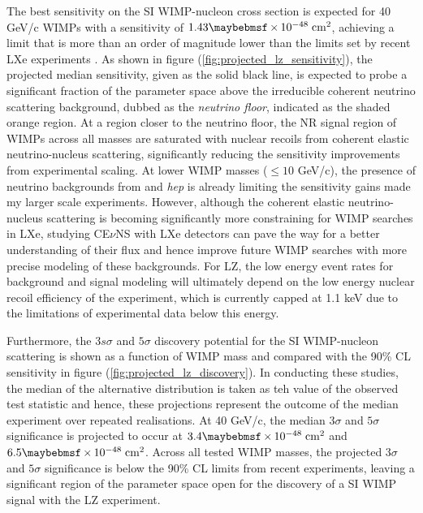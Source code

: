 {The best sensitivity on the SI WIMP-nucleon cross section is expected for 40 GeV/c\squared{} WIMPs with a sensitivity of $1.43 \times 10^{-48} \; \MathText{cm}^2$, achieving a limit that is more than an order of magnitude lower than the limits set by recent LXe experiments \cite{lux_full, xenon_1t, pandax_limit}. As shown in figure (\ref{fig:projected_lz_sensitivity}), the projected median sensitivity, given as the solid black line, is expected to probe a significant fraction of the parameter space above the irreducible coherent neutrino scattering background, dubbed as the \textit{neutrino floor}, indicated as the shaded orange region. At a region closer to the neutrino floor, the NR signal region of WIMPs across all masses are saturated with nuclear recoils from coherent elastic neutrino-nucleus scattering, significantly reducing the sensitivity improvements from experimental scaling. At lower WIMP masses ($\leqslant10$ GeV/c\squared{}), the presence of neutrino backgrounds from \BE{} and \textit{hep} is already limiting the sensitivity gains made my larger scale experiments. However, although the coherent elastic neutrino-nucleus scattering is becoming significantly more constraining for WIMP searches in LXe, studying CE$\nu$NS with LXe detectors can pave the way for a better understanding of their flux and hence improve future WIMP searches with more precise modeling of these backgrounds. For LZ, the low energy event rates for background and signal modeling will ultimately depend on the low energy nuclear recoil efficiency of the experiment, which is currently capped at 1.1 keV due to the limitations of experimental data below this energy.  

Furthermore, the $3s\sigma$ and $5\sigma$ discovery potential for the SI WIMP-nucleon scattering is shown as a function of WIMP mass and compared with the 90\% CL sensitivity in figure (\ref{fig:projected_lz_discovery}). In conducting these studies, the median of the alternative distribution is taken as teh value of the observed test statistic and hence, these projections represent the outcome of the median experiment over repeated realisations. At 40 GeV/c\squared{}, the median $3\sigma$ and $5\sigma$ significance is projected to occur at $3.4 \times 10^{-48} \; \MathText{cm}^2$ and $6.5 \times 10^{-48} \; \MathText{cm}^2$. Across all tested WIMP masses, the projected $3\sigma$ and $5\sigma$ significance is below the 90\% CL limits from recent experiments, leaving a significant region of the parameter space open for the discovery of a SI WIMP signal with the LZ experiment.

}
